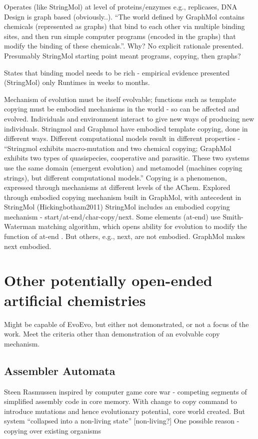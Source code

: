 Operates (like StringMol) at level of proteins/enzymes e.g., replicases, DNA
Design is graph based (obviously..). ``The world defined by GraphMol contains chemicals (represented as graphs) that bind to each other via multiple binding sites, and then run simple computer programs (encoded in the graphs) that modify the binding of these chemicals.''. Why? No explicit rationale presented. Presumably StringMol starting point meant programs, copying, then graphs? 

States that binding model needs to be rich - empirical evidence presented (StringMol) only
Runtimes in weeks to months.

Mechanism of evolution must be itself evolvable; functions such as template copying must be embodied mechanisms in the world - so can be affected and evolved.
Individuals and environment interact to give new ways of producing new individuals.
Stringmol and Graphmol have embodied template copying, done in different ways. Different computational models result in different properties - ``Stringmol exhibits macro-mutation and two chemical copying; GraphMol exhibits two types of quasispecies, cooperative and parasitic. These two systems use the same domain (emergent evolution) and metamodel (machines copying strings), but different computational models.''
Copying is a phenomenon, expressed through mechanisms at different levels of the AChem. Explored through embodied copying mechanism built in GraphMol, with antecedent in StringMol (Hickingbotham2011)
StringMol includes an embodied copying mechanism - start/at-end/char-copy/next. Some elements (at-end) use Smith-Waterman matching algorithm, which opens ability for evolution to modify the function of at-end \parencite[p.143]{Nellis2012}. But others, e.g., next, are not embodied. GraphMol makes next embodied.

\section{Other potentially open-ended artificial chemistries}
Might be capable of EvoEvo, but either not demonstrated, or not a focus of the work. Meet the criteria other than demonstration of an evolvable copy mechanism.

\subsection{Assembler Automata}

Steen Rasmussen inspired by computer game core war - competing segments of simplified assembly code in core memory. With change to copy command to introduce mutations and hence evolutionary potential,
core world created. But system ``collapsed into a non-living state'' {[}non-living?{]} One possible reason - copying over existing organisms \parencite{Ofria2004}

